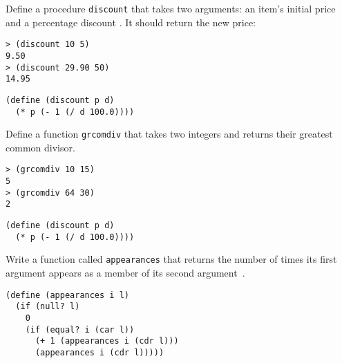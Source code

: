 \documentclass[addpoints,12pt,a4paper]{exam}
\begin{document}
\begin{questions}
\begin{solution}
\end{solution}


\question
Define a procedure \texttt{discount} that takes two arguments: an item’s initial price and a percentage discount \cite{simplyscheme}.
It should return the new price:
\begin{verbatim}
> (discount 10 5)
9.50
> (discount 29.90 50)
14.95
\end{verbatim}


\begin{solution}
  \begin{verbatim}
(define (discount p d)
  (* p (- 1 (/ d 100.0))))
  \end{verbatim}
\end{solution}


\question
Define a function \texttt{grcomdiv} that takes two integers and returns their greatest common divisor.
\begin{verbatim}
> (grcomdiv 10 15)
5
> (grcomdiv 64 30)
2
\end{verbatim}


\begin{solution}
  \begin{verbatim}
(define (discount p d)
  (* p (- 1 (/ d 100.0))))
  \end{verbatim}
\end{solution}

\question
Write a function called \texttt{appearances} that returns the number of times its first argument appears as a member of its second argument~\cite{simplyscheme}.

\begin{solution}
  \begin{verbatim}
(define (appearances i l)
  (if (null? l)
    0
    (if (equal? i (car l))  
      (+ 1 (appearances i (cdr l)))
      (appearances i (cdr l)))))   
  \end{verbatim}
\end{solution}


\end{questions}
\end{document}
